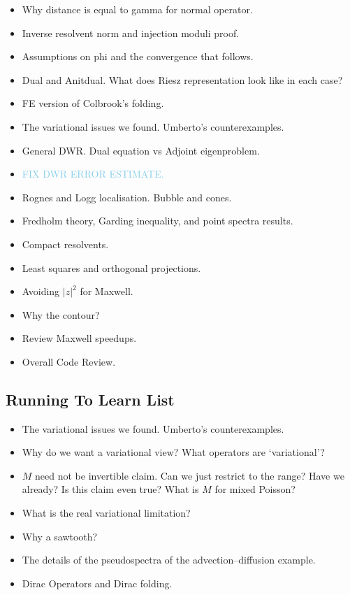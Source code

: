 \documentclass[12pt,a4paper]{article}
\newcommand{\skyblue}[1]{\textcolor{SkyBlue}{#1}}
\begin{document}
\begin{itemize}
    \item Why distance is equal to gamma for normal operator. 
    \item Inverse resolvent norm and injection moduli proof. 
    \item Assumptions on phi and the convergence that follows. 
    \item Dual and Anitdual. What does Riesz representation look like in each case?
    \item FE version of Colbrook's folding.
    \item The variational issues we found. Umberto's counterexamples. 
    \item General DWR. Dual equation vs Adjoint eigenproblem.
    \item \skyblue{FIX DWR ERROR ESTIMATE.}
    \item Rognes and Logg localisation. Bubble and cones. 
    \item Fredholm theory, Garding inequality, and point spectra results. 
    \item Compact resolvents.
    \item Least squares and orthogonal projections.
    \item Avoiding $|z|^2$ for Maxwell. 
    \item Why the contour?
    \item Review Maxwell speedups.
    \item Overall Code Review.
    
\end{itemize}


\subsection{Running To Learn List}

\begin{itemize}
    \item The variational issues we found. Umberto's counterexamples. 
        \item Why do we want a variational view? What operators are `variational'?
    \item $M$ need not be invertible claim. Can we just restrict to the range? Have we already? Is this claim even true? What is $M$ for mixed Poisson? 
    \item What is the real variational limitation? 
    \item Why a sawtooth?
    \item The details of the pseudospectra of the advection--diffusion example. 
    \item Dirac Operators and Dirac folding.
    
\end{itemize}
\end{document}

